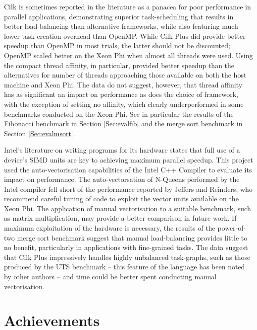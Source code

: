 \documentclass{report}
\begin{document}
Cilk is sometimes reported in the literature as a panacea for poor performance in parallel applications\cite{Blumofe95}\cite{Dailey01}\cite{Leiserson09}, demonstrating superior task-scheduling that results in better load-balancing than alternative frameworks, while also featuring much lower task creation overhead than OpenMP. While Cilk Plus did provide better speedup than OpenMP in most trials, the latter should not be discounted; OpenMP scaled better on the Xeon Phi when almost all threads were used. Using the compact thread affinity, in particular, provided better speedup than the alternatives for number of threads approaching those available on both the host machine and Xeon Phi. The data do not suggest, however, that thread affinity has as significant an impact on performance as does the choice of framework, with the exception of setting no affinity, which clearly underperformed in some benchmarks conducted on the Xeon Phi. See in particular the results of the Fibonacci benchmark in Section \ref{Sec:evalfib} and the merge sort benchmark in Section \ref{Sec:evalmsort}.

Intel's literature on writing programs for its hardware states that full use of a device's SIMD units are key to achieving maximum parallel speedup\cite{overviewxeonandxeonphi}. This project used the auto-vectorisation capabilities of the Intel C++ Compiler to evaluate its impact on performance. The auto-vectorsation of N-Queens performed by the Intel compiler fell short of the performance reported by Jeffers and Reinders\cite{Jeffers13}, who recommend careful tuning of code to exploit the vector units available on the Xeon Phi. The application of manual vectorisation to a suitable benchmark, such as matrix multiplication, may provide a better comparison in future work. If maximum exploitation of the hardware is necessary, the results of the power-of-two merge sort benchmark suggest that manual load-balancing provides little to no benefit, particularly in applications with fine-grained tasks. The data suggest that Cilk Plus impressively handles highly unbalanced task-graphs, such as those produced by the UTS benchmark -- this feature of the language has been noted by other authors \cite{Tousimojarad14} -- and time could be better spent conducting manual vectorisation.

\section{Achievements}
\end{document}
